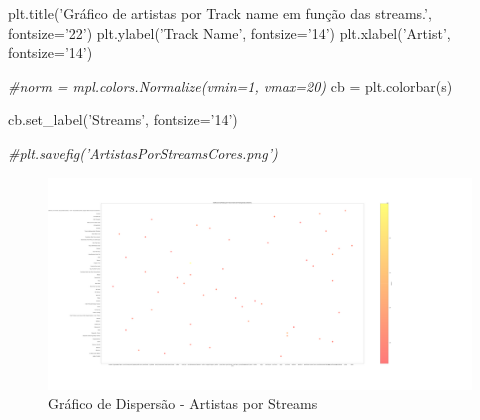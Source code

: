 \documentclass[11pt]{article}
\makeatletter
\def\maxwidth{\ifdim\Gin@nat@width>\linewidth\linewidth
    \else\Gin@nat@width\fi}
\let\Oldincludegraphics\includegraphics
\renewcommand{\includegraphics}[1]{\Oldincludegraphics[width=.8\maxwidth]{#1}}
\newenvironment{Shaded}{}{}
\newcommand{\StringTok}[1]{\textcolor[rgb]{0.25,0.44,0.63}{{#1}}}
\newcommand{\CommentTok}[1]{\textcolor[rgb]{0.38,0.63,0.69}{\textit{{#1}}}}
\newcommand{\NormalTok}[1]{{#1}}
\newcommand{\OperatorTok}[1]{\textcolor[rgb]{0.40,0.40,0.40}{{#1}}}
\makeatother
\begin{document}
\begin{Shaded}
\begin{Highlighting}[]
\NormalTok{plt.title(}\StringTok{'Gráfico de artistas por Track name em função das streams.'}\NormalTok{, fontsize}\OperatorTok{=}\StringTok{'22'}\NormalTok{)}
\NormalTok{plt.ylabel(}\StringTok{'Track Name'}\NormalTok{, fontsize}\OperatorTok{=}\StringTok{'14'}\NormalTok{)}
\NormalTok{plt.xlabel(}\StringTok{'Artist'}\NormalTok{, fontsize}\OperatorTok{=}\StringTok{'14'}\NormalTok{)}


\CommentTok{#norm = mpl.colors.Normalize(vmin=1, vmax=20)}
\NormalTok{cb }\OperatorTok{=}\NormalTok{ plt.colorbar(s)}

\NormalTok{cb.set_label(}\StringTok{'Streams'}\NormalTok{, fontsize}\OperatorTok{=}\StringTok{'14'}\NormalTok{)}


\CommentTok{#plt.savefig('ArtistasPorStreamsCores.png') }
\end{Highlighting}
\end{Shaded}

\begin{figure}
\centering
\includegraphics{ArtistasPorStreamsCor.png}
\caption{Gráfico de Dispersão - Artistas por Streams}
\end{figure}


    
    
    
    
\end{document}

